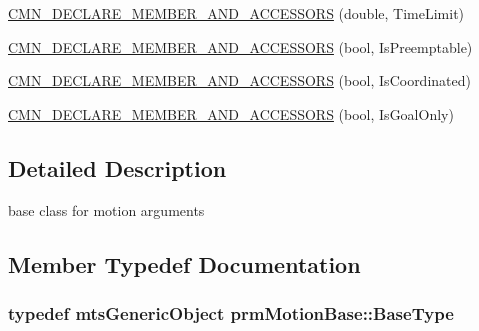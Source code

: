 {\bf }\par
\begin{DoxyCompactItemize}
\item 
\hyperlink{classprm_motion_base_a843aed0d6371bf0dd33c763bc94c8ea3}{C\-M\-N\-\_\-\-D\-E\-C\-L\-A\-R\-E\-\_\-\-M\-E\-M\-B\-E\-R\-\_\-\-A\-N\-D\-\_\-\-A\-C\-C\-E\-S\-S\-O\-R\-S} (double, Time\-Limit)
\end{DoxyCompactItemize}

{\bf }\par
\begin{DoxyCompactItemize}
\item 
\hyperlink{classprm_motion_base_ac5ccd565d71aa9c29b857a2adf02a522}{C\-M\-N\-\_\-\-D\-E\-C\-L\-A\-R\-E\-\_\-\-M\-E\-M\-B\-E\-R\-\_\-\-A\-N\-D\-\_\-\-A\-C\-C\-E\-S\-S\-O\-R\-S} (bool, Is\-Preemptable)
\end{DoxyCompactItemize}

{\bf }\par
\begin{DoxyCompactItemize}
\item 
\hyperlink{classprm_motion_base_a5cadf4180ea1b4894065f53a6840a942}{C\-M\-N\-\_\-\-D\-E\-C\-L\-A\-R\-E\-\_\-\-M\-E\-M\-B\-E\-R\-\_\-\-A\-N\-D\-\_\-\-A\-C\-C\-E\-S\-S\-O\-R\-S} (bool, Is\-Coordinated)
\end{DoxyCompactItemize}

{\bf }\par
\begin{DoxyCompactItemize}
\item 
\hyperlink{classprm_motion_base_a105f088e102123a82f6aae73212d4c9c}{C\-M\-N\-\_\-\-D\-E\-C\-L\-A\-R\-E\-\_\-\-M\-E\-M\-B\-E\-R\-\_\-\-A\-N\-D\-\_\-\-A\-C\-C\-E\-S\-S\-O\-R\-S} (bool, Is\-Goal\-Only)
\end{DoxyCompactItemize}



\subsection{Detailed Description}
base class for motion arguments 

\subsection{Member Typedef Documentation}
\hypertarget{classprm_motion_base_aef2350979e92dcdd61088ee026a8b87b}{
\subsubsection[{Base\-Type}]{\setlength{\rightskip}{0pt plus 5cm}typedef {\bf mts\-Generic\-Object} {\bf prm\-Motion\-Base\-::\-Base\-Type}}}\label{classprm_motion_base_aef2350979e92dcdd61088ee026a8b87b}


